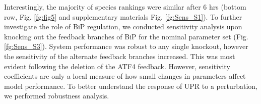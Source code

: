 \documentclass[fleqn,10pt]{wlscirep}
\begin{document}
Interestingly, the majority of species rankings were similar after 6 hrs (bottom row,  Fig. \ref{fg:fig5} and supplementary materials Fig. \ref{fg:Sens_S1}).
To further investigate the role of BiP regulation, we conducted sensitivity analysis upon knocking out the feedback branches of BiP for the nominal parameter set (Fig. \ref{fg:Sens_S3}).
System performance was robust to any single knockout, however the sensitivity of the alternate feedback branches increased.
This was most evident following the deletion of the ATF4 feedback.
However, sensitivity coefficients are only a local measure of how small changes in parameters affect model performance.
To better understand the response of UPR to a perturbation, we performed robustness analysis.

\end{document}
